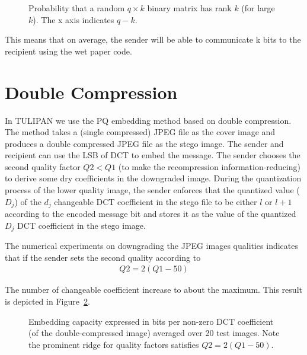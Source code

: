 \begin{figure}
\begin{center}
\caption{Probability that a random $q \times k$ binary matrix has
  rank $k$ (for large $k$). The x axis indicates $q - k$.}
\label{ChapAlgSecCapFigProb}
\end{center}
\end{figure}

This means that on average, the sender will be able to communicate k bits to the recipient using the wet paper code.

\section{Double Compression}
In TULIPAN we use the PQ embedding method based on double compression. The method takes a (single compressed) JPEG file as the cover image and produces a double compressed JPEG file as the stego image. The sender and recipient can use the LSB of DCT to embed the message. The sender chooses the second quality factor $Q2 < Q1$ (to make the recompression information-reducing) to derive some dry coefficients in the downgraded image. During the quantization process of the lower quality image, the sender enforces that the quantized value ($D_{j}$) of the $d_{j}$ changeable DCT coefficient in the stego file to be either $l$ or $l+1$ according to the encoded message bit and stores it as the value of the quantized $D_{j}$ DCT coefficient in the stego image.

The numerical experiments on downgrading the JPEG images qualities indicates that if the sender sets the second quality according to
\begin{eqnarray}
Q2 = 2(Q1 - 50)
\end{eqnarray}

The number of changeable coefficient increase to about the maximum. This result is depicted in Figure~\ref{ChapAlgSecDoubleFigCap}.

\begin{figure}
\begin{center}
\caption{Embedding capacity expressed in bits per non-zero DCT coefficient (of the double-compressed image) averaged over 20 test images. Note the prominent ridge for quality factors satisfies $Q2 = 2(Q1 - 50)$.} 
\label{ChapAlgSecDoubleFigCap}
\end{center}
\end{figure}

